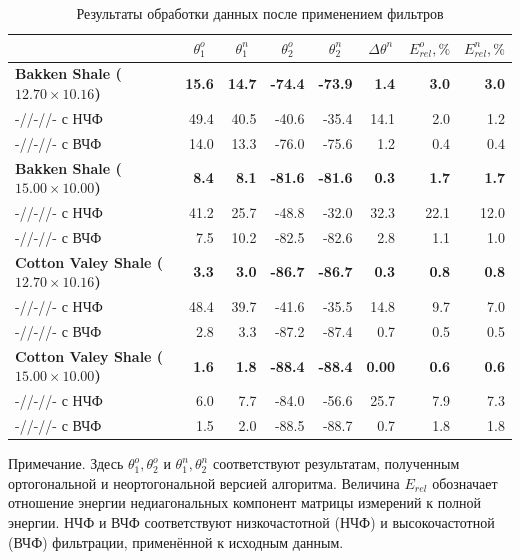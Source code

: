 \documentclass[a4paper,11pt]{article}
\begin{document}
\begin{table}[h]
	\footnotesize
	\centering
	\caption{Результаты обработки данных после применением фильтров}
	\renewcommand{\arraystretch}{1.5}
	\begin{tabularx}{\textwidth}{|X|rr|rr|r|rr|}
		\hline
		&\multicolumn{1}{c}{$\theta_1^o$} & \multicolumn{1}{c|}{$\theta_1^n$} & \multicolumn{1}{c}{$\theta_2^o$} & \multicolumn{1}{c|}{$\theta_2^n$} & \multicolumn{1}{c|}{$\Delta\theta^n$}& \multicolumn{1}{c}{$E_{rel}^o, \%$} & \multicolumn{1}{c|}{$E_{rel}^n, \%$} \\ \hline
		\hline	\textbf{Bakken Shale ($12.70 \times 10.16$)} & \textbf{15.6} & \textbf{14.7} & \textbf{-74.4}  & \textbf{-73.9}  & \textbf{1.4}  & \textbf{3.0} & \textbf{3.0} \\
		-//-//- с НЧФ & 49.4 & 40.5 & -40.6 & -35.4  & 14.1 & 2.0 & 1.2\\
		-//-//- с ВЧФ & 14.0 & 13.3 & -76.0 & -75.6  & 1.2 & 0.4 & 0.4\\
		\hline	\textbf{Bakken Shale ($15.00 \times 10.00$)} & \textbf{8.4} & \textbf{8.1} & \textbf{-81.6}  & \textbf{-81.6} & \textbf{0.3}  & \textbf{1.7} & \textbf{1.7} \\
		-//-//- с НЧФ & 41.2 & 25.7 & -48.8 & -32.0  & 32.3 & 22.1 & 12.0\\
		-//-//- с ВЧФ & 7.5 & 10.2 & -82.5 & -82.6  & 2.8 & 1.1 & 1.0\\
		\hline	\textbf{Cotton Valey Shale ($12.70 \times 10.16$)} & \textbf{3.3} & \textbf{3.0} & \textbf{-86.7}  & \textbf{-86.7}  & \textbf{0.3}  & \textbf{0.8} & \textbf{0.8}\\
		-//-//- с НЧФ & 48.4 & 39.7 & -41.6 & -35.5  & 14.8  & 9.7 & 7.0 \\
		-//-//- с ВЧФ & 2.8 & 3.3 & -87.2 & -87.4  & 0.7  & 0.5 & 0.5\\	
		\hline	\textbf{Cotton Valey Shale ($15.00 \times 10.00$)} & \textbf{1.6} & \textbf{1.8} & \textbf{-88.4}  & \textbf{-88.4}  & \textbf{0.00}  & \textbf{0.6} & \textbf{0.6} \\
		-//-//- с НЧФ & 6.0 & 7.7 & -84.0 & -56.6  & 25.7  & 7.9 & 7.3 \\
		-//-//- с ВЧФ & 1.5 & 2.0 & -88.5 & -88.7  & 0.7  & 1.8 & 1.8\\		
		\hline	
	\end{tabularx} 
	\begin{flushleft}
		Примечание. Здесь $\theta_1^o,\theta_2^o$ и $\theta_1^n,\theta_2^n$ соответствуют результатам, полученным ортогональной и неортогональной версией алгоритма. Величина $E_{rel}$ обозначает отношение энергии недиагональных компонент матрицы измерений к полной энергии. НЧФ и ВЧФ соответствуют низкочастотной (НЧФ) и высокочастотной (ВЧФ) фильтрации, применённой к исходным данным.
	\end{flushleft}
	\label{tab:filter_process_results}
	\renewcommand{\arraystretch}{1.0}
\end{table}

\clearpage

%
%


%



%
\end{document}
